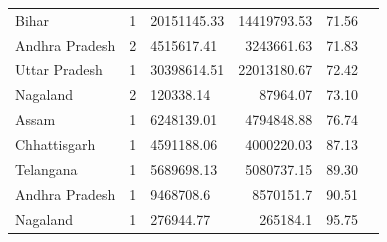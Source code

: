 \documentclass{article}
\begin{document}
\begin{table}[h!]
{\begin{tabular}{|l|l|l|r|r|r|}
			Bihar                         & 1  & 20151145.33 & 14419793.53 & 71.56 \\
			Andhra Pradesh                & 2  & 4515617.41 & 3243661.63 & 71.83 \\
			Uttar Pradesh                 & 1  & 30398614.51 & 22013180.67 & 72.42 \\
			Nagaland                      & 2  & 120338.14   & 87964.07   & 73.10 \\
			Assam                         & 1  & 6248139.01  & 4794848.88 & 76.74 \\
			Chhattisgarh                  & 1  & 4591188.06  & 4000220.03 & 87.13 \\
			Telangana                     & 1  & 5689698.13  & 5080737.15 & 89.30 \\
			Andhra Pradesh                & 1  & 9468708.6   & 8570151.7  & 90.51 \\
			Nagaland                      & 1  & 276944.77   & 265184.1   & 95.75 \\
			\hline
		\end{tabular}
	}
\end{table}
\end{document}
